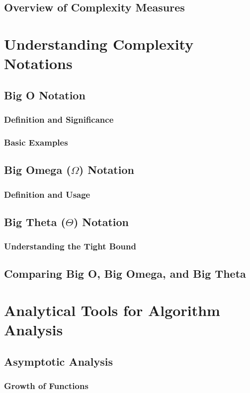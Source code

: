 \documentclass[12pt]{book} %
\begin{document}
\subsection{Overview of Complexity Measures}

\section{Understanding Complexity Notations}
\subsection{Big O Notation}
\subsubsection{Definition and Significance}
\subsubsection{Basic Examples}
\subsection{Big Omega (\(\Omega\)) Notation}
\subsubsection{Definition and Usage}
\subsection{Big Theta (\(\Theta\)) Notation}
\subsubsection{Understanding the Tight Bound}
\subsection{Comparing Big O, Big Omega, and Big Theta}

\section{Analytical Tools for Algorithm Analysis}
\subsection{Asymptotic Analysis}
\subsubsection{Growth of Functions}
\end{document}
